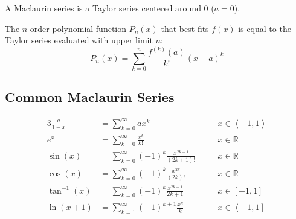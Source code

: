 \documentclass[12pt]{article}
\newcommand*{\R}{\mathbb{R}}
\newcommand*{\rmaskip}{\setlength{\abovedisplayskip}{0pt}}
\newcommand*{\rmbskip}{\setlength{\belowdisplayskip}{0pt}}
\newcommand*{\rmskip}{\rmaskip \rmbskip}
\newcommand*{\isum}[1][k]{\sum_{#1=0}^\infty}
\begin{document}
A Maclaurin series is a Taylor series centered around 0 (\(a = 0\)).

The \(n\)-order polynomial function \(P_n(x)\) that best fits \(f(x)\) is
equal to the Taylor series evaluated with upper limit \(n\):
\[
  P_n(x) = \sum_{k=0}^{n} \frac{f^{(k)}(a)}{k!}{(x-a)}^k
\]
\subsection*{Common Maclaurin Series}
{\rmskip\begin{alignat*}{3}
  \frac{a}{1-x} &= \isum ax^k &&\quad x \in \left<-1,1\right>\\
  e^x &= \isum \frac{x^k}{k!} &&\quad x \in \R\\
  \sin(x) &= \isum {(-1)}^k \frac{x^{2k+1}}{(2k+1)!} &&\quad x \in \R\\
  \cos(x) &= \isum {(-1)}^k \frac{x^{2k}}{(2k)!} &&\quad x \in \R\\
  \tan^{-1}(x) &= \isum {(-1)}^k \frac{x^{2k+1}}{2k+1} &&\quad x \in [-1,1]\\
  \ln(x+1) &= \sum_{k=1}^\infty {(-1)}^{k+1} \frac{x^k}{k} &&\quad x \in
    \left<-1,1\right]
\end{alignat*}}%
\end{document}
